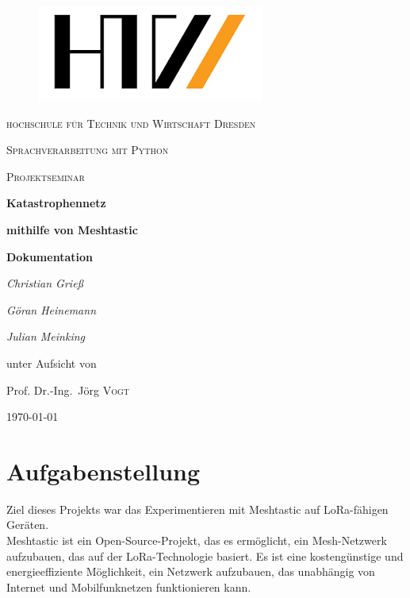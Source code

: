 \documentclass[12pt,a4paper]{article}
\author{Christian Grieß}
\begin{document}
\begin{titlepage}
\begin{figure}
	\centering \includegraphics[scale=1]{HTW_LOGO.png}
\end{figure}

	
	\centering
	{\scshape\LARGE hochschule für Technik und Wirtschaft Dresden \par}
	\vspace{2cm}
	{\scshape\Large Sprachverarbeitung mit Python\par}
	\vspace{0cm}
	{\scshape\Large Projektseminar \par}
	\vspace{1.5cm}
	{\huge\bfseries Katastrophennetz\par}
	{\huge\bfseries mithilfe von Meshtastic\par}
	\vspace{1.5cm}
	{\huge\bfseries {Dokumentation}\par}	
	\vspace{4cm}
	{\Large\itshape Christian Grieß\par}
	{\Large\itshape Göran Heinemann\par}
	{\Large\itshape Julian Meinking\par}
	\vfill
	unter Aufsicht von\par
	Prof. Dr.-Ing.~Jörg \textsc{Vogt}

	\vfill

	{\large \today\par}
\end{titlepage}
\newpage
\tableofcontents

\newpage
\section{Aufgabenstellung}

Ziel dieses Projekts war das Experimentieren mit Meshtastic auf LoRa-fähigen Geräten.\\
Meshtastic ist ein Open-Source-Projekt, das es ermöglicht, ein Mesh-Netzwerk aufzubauen, das auf der LoRa-Technologie basiert. Es ist eine kostengünstige und energieeffiziente Möglichkeit, ein Netzwerk aufzubauen, das unabhängig von Internet und Mobilfunknetzen funktionieren kann.
\end{document}
